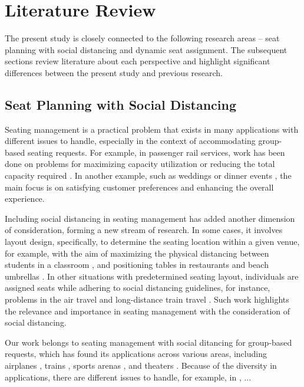\section{Literature Review}\label{literature}
The present study is closely connected to the following research areas -- seat planning with social distancing and dynamic seat assignment. The subsequent sections review literature about each perspective and highlight significant differences between the present study and previous research.


\subsection{Seat Planning with Social Distancing}
Seating management is a practical problem that exists in many applications with different issues to handle, especially in the context of accommodating group-based seating requests.  For example, in  passenger rail services, work has been done on problems for maximizing capacity utilization or reducing the total capacity required \cite{clausen2010off, deplano2019offline}. In another example, such as weddings or dinner events \cite{lewis2016creating}, the main focus is on satisfying customer preferences and enhancing the overall experience. 

Including social distancing in seating management has added another dimension of consideration, forming a new stream of research. In some cases, it involves layout design, specifically, to determine the seating location within a given venue, for example, with the aim of maximizing the physical distancing between students in a classroom \cite{bortolete2022support}, and positioning tables in restaurants and beach umbrellas \cite{fischetti2023safe}. In other situations with predetermined seating layout, individuals are assigned seats while adhering to social distancing guidelines, for instance, problems in the air travel \cite{ghorbani2020model} and long-distance train travel \cite{haque2022optimization}. Such work highlights the relevance and importance in seating management with the consideration of social distancing.


Our work belongs to seating management with social ditancing for group-based requests, which has found its applications across various areas, including airplanes \cite{salari2022social}, trains \cite{haque2023social}, sports arenas \cite{kwag2022optimal}, and theaters \cite{blom2022filling}. Because of the diversity in applications, there are different issues to handle, for example, in \cite{salari2022social}, ... 

